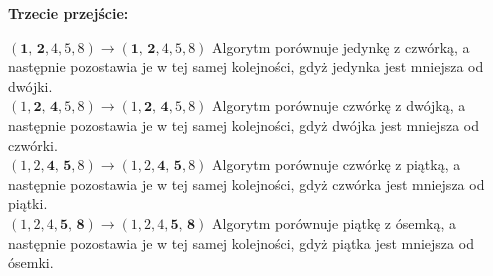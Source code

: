 \documentclass[knowledge.tex]{subfiles}
\begin{document}
    \textbf{Trzecie przejście:}
    \begin{addmargin}[2em]{0em}
        $( \textbf{1, 2}, 4, 5, 8 ) \rightarrow ( \textbf{1, 2}, 4, 5, 8 )$ Algorytm porównuje jedynkę z czwórką, a następnie pozostawia je w tej samej kolejności, gdyż jedynka jest mniejsza od dwójki.\\[0.1cm]
        $( 1, \textbf{2, 4}, 5, 8 ) \rightarrow ( 1, \textbf{2, 4}, 5, 8 )$ Algorytm porównuje czwórkę z dwójką, a następnie pozostawia je w tej samej kolejności, gdyż dwójka jest mniejsza od czwórki.\\[0.1cm]
        $( 1, 2, \textbf{4, 5}, 8 ) \rightarrow ( 1, 2, \textbf{4, 5}, 8 )$ Algorytm porównuje czwórkę z piątką, a następnie pozostawia je w tej samej kolejności, gdyż czwórka jest mniejsza od piątki.\\[0.1cm]
        $( 1, 2, 4, \textbf{5, 8} ) \rightarrow ( 1, 2, 4, \textbf{5, 8} )$ Algorytm porównuje piątkę z ósemką, a następnie pozostawia je w tej samej kolejności, gdyż piątka jest mniejsza od ósemki.\\[0.1cm]
    \end{addmargin}
\end{document}
